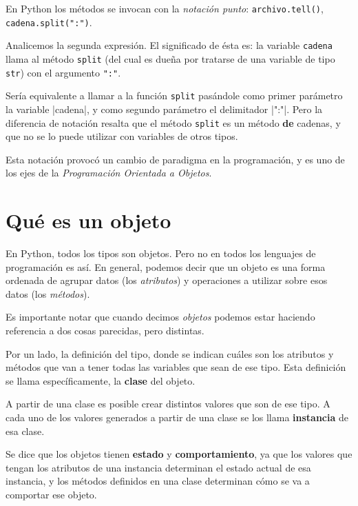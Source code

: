 \begin{observacion}
En Python los métodos se invocan con la \emph{notación punto}:
\lstinline+archivo.tell()+, \lstinline+cadena.split(":")+.

Analicemos la segunda expresión.  El significado de ésta es: la variable
\lstinline!cadena! llama al método \lstinline+split+ (del cual es dueña
por tratarse de una variable de tipo \lstinline!str!) con el argumento
\lstinline+":"+.

Sería equivalente a llamar a la función \lstinline!split! pasándole como
primer parámetro la variable |cadena|, y como segundo parámetro el delimitador
|":"|.
Pero la diferencia de notación resalta que el método \lstinline!split! es
un método {\bf de} cadenas, y que no se lo puede utilizar con variables de
otros tipos.

Esta notación provocó un cambio de paradigma en la programación, y es uno de
los ejes de la \emph{Programación Orientada a Objetos}.
\end{observacion}

\section{Qué es un objeto}

En Python, todos los tipos son objetos.  Pero no en todos los lenguajes de
programación es así.  En general, podemos decir que un objeto es una forma
ordenada de agrupar datos (los \emph{atributos}) y operaciones a utilizar
sobre esos datos (los \emph{métodos}).

Es importante notar que cuando decimos \emph{objetos} podemos estar haciendo
referencia a dos cosas parecidas, pero distintas.

Por un lado, la definición del tipo, donde se indican cuáles son los
atributos y métodos que van a tener todas las variables que sean de ese
tipo.  Esta definición se llama específicamente, la {\bf clase} del objeto.

A partir de una clase es posible crear distintos valores que son de ese
tipo. A cada uno de los valores generados a partir de una clase se los llama
{\bf instancia} de esa clase.

\begin{observacion}
Se dice que los objetos tienen {\bf estado} y {\bf comportamiento}, ya que
los valores que tengan los atributos de una instancia determinan el estado
actual de esa instancia, y los métodos definidos en una clase determinan
cómo se va a comportar ese objeto.
\end{observacion}

